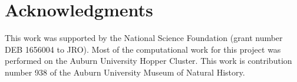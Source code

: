 \section{Acknowledgments}
This work was supported by the National Science Foundation (grant number DEB
1656004 to JRO).
Most of the computational work for this project was performed on the
Auburn University Hopper Cluster.
This work is contribution number 938 of the Auburn University
Museum of Natural History.
